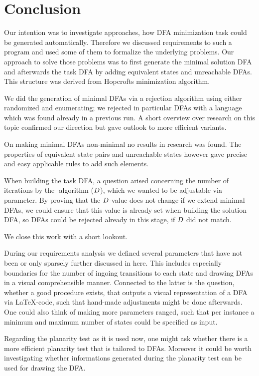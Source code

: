 
\chapter{Conclusion}

Our intention was to investigate approaches, how DFA minimization task could be generated automatically. Therefore we discussed requirements to such a program and used some of them to formalize the underlying problems. Our approach to solve those problems was to first generate the minimal solution DFA and afterwards the task DFA by adding equivalent states and unreachable DFAs. This structure was derived from Hopcrofts minimization algorithm.

We did the generation of minimal DFAs via a rejection algorithm using either randomized and enumerating; we rejected in particular DFAs with a language which was found already in a previous run. A short overview over research on this topic confirmed our direction but gave outlook to more efficient variants.

On making minimal DFAs non-minimal no results in research was found. The properties of equivalent state pairs and unreachable states however gave precise and easy applicable rules to add such elements.

When building the task DFA, a question arised concerning the number of iterations by the \CompDist-algorithm ($D$), which we wanted to be adjustable via parameter. By proving that the $D$-value does not change if we extend minimal DFAs, we could ensure that this value is already set when building the solution DFA, so DFAs could be rejected already in this stage, if $D$ did not match.

We close this work with a short lookout.

During our requirements analysis we defined several parameters that have not been or only sparsely further discussed in here. This includes especially boundaries for the number of ingoing transitions to each state and drawing DFAs in a visual comprehensible manner. Connected to the latter is the question, whether a good procedure exists, that outputs a visual representation of a DFA via LaTeX-code, such that hand-made adjustments might be done afterwards. One could also think of making more parameters ranged, such that per instance a minimum and maximum number of states could be specified as input.

Regarding the planarity test as it is used now, one might ask whether there is a more efficient planarity test that is tailored to DFAs. Moreover it could be worth investigating whether informations generated during the planarity test can be used for drawing the DFA.

